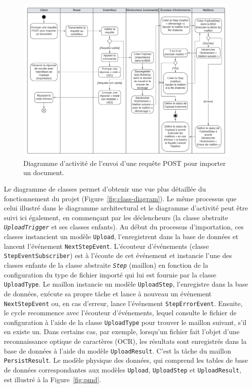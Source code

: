 \begin{figure}
    \centering
    \includegraphics[width=\textwidth]{img/import-activity-diagram}
    \caption{Diagramme d'activité de l'envoi d'une requête POST pour importer un document.}
    \label{fig:import-activity-diagram}
\end{figure}

Le diagramme de classes permet d'obtenir une vue plus détaillée du fonctionnement du projet (Figure~\ref{fig:class-diagram}). Le même processus que celui illustré dans le diagramme architectural et le diagramme d'activité peut être suivi ici également, en commençant par les déclencheurs (la classe abstraite \emph{\Verb|UploadTrigger|} et ses classes enfants). Au début du processus d'importation, ces classes instancient un modèle \Verb|Upload|, l'enregistrent dans la base de données et lancent l'événement \Verb|NextStepEvent|. L'écouteur d'événements (classe \Verb|StepEventSubscriber|) est à l'écoute de cet événement et instancie l'une des classes enfants de la classe abstraite \emph{\Verb|Step|} (maillon) en fonction de la configuration du type de fichier importé qui lui est fournie par la classe \Verb|UploadType|. Le maillon instancie un modèle \Verb|UploadStep|, l'enregistre dans la base de données, exécute sa propre tâche et lance à nouveau un événement \Verb|NextStepEvent| ou, en cas d'erreur, lance l'événement \Verb|StepErrorEvent|. Ensuite, le cycle recommence avec l'écouteur d'événements, lequel consulte le fichier de configuration à l'aide de la classe \Verb|UploadType| pour trouver le maillon suivant, s'il en existe un. Dans certains cas, par exemple, lorsqu'un fichier fait l'objet d'une reconnaissance optique de caractères (OCR), les résultats sont enregistrés dans la base de données à l'aide du modèle \Verb|UploadResult|. C'est la tâche du maillon \Verb|PersistResult|. Le modèle physique des données, qui comprend les tables de base de données correspondantes aux modèles \Verb|Upload|, \Verb|UploadStep| et \Verb|UploadResult|, est illustré à la Figure~\ref{fig:pmd}.

